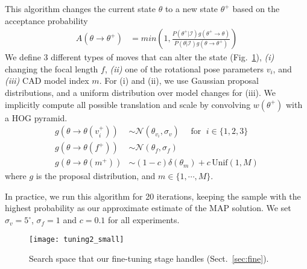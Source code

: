 This algorithm changes the current state $\theta$ to a new state $\theta^+$ based
on the acceptance probability
\begin{align}
    A(\theta \rightarrow \theta^+) & =  min\left( 1, \frac{P(\theta^+ |
            \mathcal{I}) g(\theta^+ \rightarrow \theta)}{P(\theta | \mathcal{I})
            g(\theta \rightarrow \theta^+)}\right)
\end{align}
We define $3$ different types of moves that can alter the state
(Fig.~\ref{fig:moves}), {\em (i)} changing the focal length $f$, {\em
(ii)} one of the rotational pose parameters $v_i$, and {\em (iii)} CAD model
index $m$. For (i) and (ii), we use Gaussian proposal distributions, and a
uniform distribution over model changes for (iii). We implicitly compute all
possible translation and scale by convolving $w(\theta^+)$ with a HOG pyramid.
\begin{align}
    g(\theta \rightarrow \theta(v_i^+)) & \sim
    \mathcal{N}(\theta_{v_i},\sigma_v) \quad \mbox{ for }\; i \in \{1,2,3\}\\
    g(\theta \rightarrow \theta(f^+)) & \sim \mathcal{N}(\theta_{f}, \sigma_f)\\
    g(\theta \rightarrow \theta(m^+)) & \sim (1-c) \delta(\theta_m) +
    c\,\textrm{Unif}(1,M)
\end{align}
where $g$ is the proposal distribution, and $m \in \{1,\cdots,M\}$. 
%

In practice, we run this algorithm for 20 iterations, keeping
the sample with the highest probability as our approximate estimate of
the MAP solution. We set $\sigma_v = 5^\circ$, $\sigma_f = 1$ and
$c = 0.1$ for all experiments.

\begin{figure}[t]
\centering
    \texttt{[image: tuning2\_small]} \\ [-5pt]
    \caption{Search space that our fine-tuning stage handles (Sect.~\ref{sec:fine}).}
 \label{fig:moves}
\end{figure}


